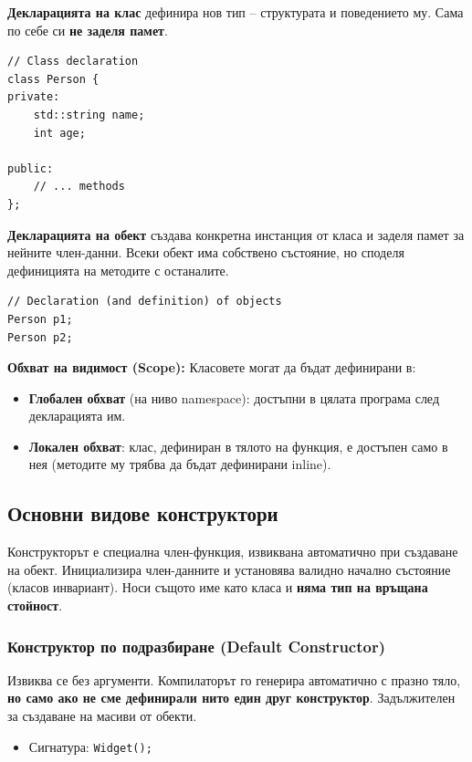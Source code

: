\documentclass{scrartcl}
\begin{document}
\begin{FlushLeft}
\textbf{Декларацията на клас} дефинира нов тип -- структурата и поведението му. Сама по себе си \textbf{не заделя памет}.

\begin{lstlisting}
// Class declaration
class Person {
private:
    std::string name;
    int age;

public:
    // ... methods
};
\end{lstlisting}

\textbf{Декларацията на обект} създава конкретна инстанция от класа и заделя памет за нейните член-данни. Всеки обект има собствено състояние, но споделя дефиницията на методите с останалите.

\begin{lstlisting}
// Declaration (and definition) of objects
Person p1;
Person p2;
\end{lstlisting}

\textbf{Обхват на видимост (Scope):} Класовете могат да бъдат дефинирани в:
\begin{itemize}
    \item \textbf{Глобален обхват} (на ниво namespace): достъпни в цялата програма след декларацията им.
    \item \textbf{Локален обхват}: клас, дефиниран в тялото на функция, е достъпен само в нея (методите му трябва да бъдат дефинирани inline).
\end{itemize}

\subsection{Основни видове конструктори}

Конструкторът е специална член-функция, извиквана автоматично при създаване на обект. Инициализира член-данните и установява валидно начално състояние (класов инвариант). Носи същото име като класа и \textbf{няма тип на връщана стойност}.

\subsubsection{Конструктор по подразбиране (Default Constructor)}
Извиква се без аргументи. Компилаторът го генерира автоматично с празно тяло, \textbf{но само ако не сме дефинирали нито един друг конструктор}. Задължителен за създаване на масиви от обекти.
\begin{itemize}
    \item Сигнатура: \texttt{Widget();}
\end{itemize}


\end{FlushLeft}
\end{document}
